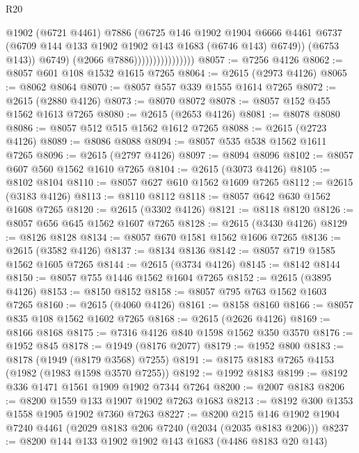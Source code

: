 \begin{lexlean}{R20}
\begin{coremodule}
                                      @1902
                                      (@6721 @4461)
                                      @7886
                                      (@6725
                                        @146
                                        @1902
                                        @1904
                                        @6666
                                        @4461
                                        @6737
                                        (@6709 @144 @133 @1902 @1902 @143 @1683 (@6746 @143) @6749))
                                      (@6753 @143))
                                    @6749)
                                  (@2066 @7886))))))))))))))))
@8057 := @7256 @4126
@8062 := @8057 @601 @108 @1532 @1615 @7265
@8064 := @2615 (@2973 @4126)
@8065 := @8062 @8064
@8070 := @8057 @557 @339 @1555 @1614 @7265
@8072 := @2615 (@2880 @4126)
@8073 := @8070 @8072
@8078 := @8057 @152 @455 @1562 @1613 @7265
@8080 := @2615 (@2653 @4126)
@8081 := @8078 @8080
@8086 := @8057 @512 @515 @1562 @1612 @7265
@8088 := @2615 (@2723 @4126)
@8089 := @8086 @8088
@8094 := @8057 @535 @538 @1562 @1611 @7265
@8096 := @2615 (@2797 @4126)
@8097 := @8094 @8096
@8102 := @8057 @607 @560 @1562 @1610 @7265
@8104 := @2615 (@3073 @4126)
@8105 := @8102 @8104
@8110 := @8057 @627 @610 @1562 @1609 @7265
@8112 := @2615 (@3183 @4126)
@8113 := @8110 @8112
@8118 := @8057 @642 @630 @1562 @1608 @7265
@8120 := @2615 (@3302 @4126)
@8121 := @8118 @8120
@8126 := @8057 @656 @645 @1562 @1607 @7265
@8128 := @2615 (@3430 @4126)
@8129 := @8126 @8128
@8134 := @8057 @670 @1581 @1562 @1606 @7265
@8136 := @2615 (@3582 @4126)
@8137 := @8134 @8136
@8142 := @8057 @719 @1585 @1562 @1605 @7265
@8144 := @2615 (@3734 @4126)
@8145 := @8142 @8144
@8150 := @8057 @755 @1446 @1562 @1604 @7265
@8152 := @2615 (@3895 @4126)
@8153 := @8150 @8152
@8158 := @8057 @795 @763 @1562 @1603 @7265
@8160 := @2615 (@4060 @4126)
@8161 := @8158 @8160
@8166 := @8057 @835 @108 @1562 @1602 @7265
@8168 := @2615 (@2626 @4126)
@8169 := @8166 @8168
@8175 := @7316 @4126 @840 @1598 @1562 @350 @3570
@8176 := @1952 @845
@8178 := @1949 (@8176 @2077)
@8179 := @1952 @800
@8183 := @8178 (@1949 (@8179 @3568) @7255)
@8191 := @8175 @8183 @7265 @4153 (@1982 (@1983 @1598 @3570 @7255))
@8192 := @1992 @8183
@8199 := @8192 @336 @1471 @1561 @1909 @1902 @7344 @7264
@8200 := @2007 @8183
@8206 := @8200 @1559 @133 @1907 @1902 @7263 @1683
@8213 := @8192 @300 @1353 @1558 @1905 @1902 @7360 @7263
@8227 := @8200 @215 @146 @1902 @1904 @7240 @4461 (@2029 @8183 @206 @7240 (@2034 (@2035 @8183 @206)))
@8237 := @8200 @144 @133 @1902 @1902 @143 @1683 (@4486 @8183 @20 @143)

\end{coremodule}
\end{lexlean}
